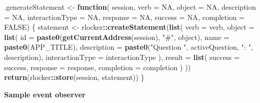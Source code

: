 \documentclass[
]{book}
\newenvironment{Shaded}{\begin{snugshade}}{\end{snugshade}}
\newcommand{\ControlFlowTok}[1]{\textcolor[rgb]{0.13,0.29,0.53}{\textbf{#1}}}
\newcommand{\DataTypeTok}[1]{\textcolor[rgb]{0.13,0.29,0.53}{#1}}
\newcommand{\KeywordTok}[1]{\textcolor[rgb]{0.13,0.29,0.53}{\textbf{#1}}}
\newcommand{\NormalTok}[1]{#1}
\newcommand{\OperatorTok}[1]{\textcolor[rgb]{0.81,0.36,0.00}{\textbf{#1}}}
\newcommand{\OtherTok}[1]{\textcolor[rgb]{0.56,0.35,0.01}{#1}}
\newcommand{\StringTok}[1]{\textcolor[rgb]{0.31,0.60,0.02}{#1}}
\begin{document}
\begin{Shaded}
\begin{Highlighting}[]
\NormalTok{.generateStatement <-}\StringTok{ }\ControlFlowTok{function}\NormalTok{(}
\NormalTok{  session,}
  \DataTypeTok{verb =} \OtherTok{NA}\NormalTok{,}
  \DataTypeTok{object =} \OtherTok{NA}\NormalTok{,}
  \DataTypeTok{description =} \OtherTok{NA}\NormalTok{,}
  \DataTypeTok{interactionType =} \OtherTok{NA}\NormalTok{,}
  \DataTypeTok{response =} \OtherTok{NA}\NormalTok{,}
  \DataTypeTok{success =} \OtherTok{NA}\NormalTok{,}
  \DataTypeTok{completion =} \OtherTok{FALSE}\NormalTok{)}
\NormalTok{\{}
\NormalTok{  statement <-}\StringTok{ }\NormalTok{rlocker}\OperatorTok{::}\KeywordTok{createStatement}\NormalTok{(}\KeywordTok{list}\NormalTok{(}
    \DataTypeTok{verb =}\NormalTok{ verb,}
    \DataTypeTok{object =} \KeywordTok{list}\NormalTok{(}
      \DataTypeTok{id =} \KeywordTok{paste0}\NormalTok{(}\KeywordTok{getCurrentAddress}\NormalTok{(session), }\StringTok{"#"}\NormalTok{, object),}
      \DataTypeTok{name =} \KeywordTok{paste0}\NormalTok{(APP_TITLE),}
      \DataTypeTok{description =} \KeywordTok{paste0}\NormalTok{(}\StringTok{"Question "}\NormalTok{, activeQuestion, }\StringTok{": "}\NormalTok{, description),}
      \DataTypeTok{interactionType =}\NormalTok{ interactionType}
\NormalTok{    ),}
    \DataTypeTok{result =} \KeywordTok{list}\NormalTok{(}
      \DataTypeTok{success =}\NormalTok{ success,}
      \DataTypeTok{response =}\NormalTok{ response,}
      \DataTypeTok{completion =}\NormalTok{ completion}
\NormalTok{    )}
\NormalTok{  ))}
  \KeywordTok{return}\NormalTok{(rlocker}\OperatorTok{::}\KeywordTok{store}\NormalTok{(session, statement))   }
\NormalTok{\}}
\end{Highlighting}
\end{Shaded}

\textbf{Sample event observer}
\end{document}
